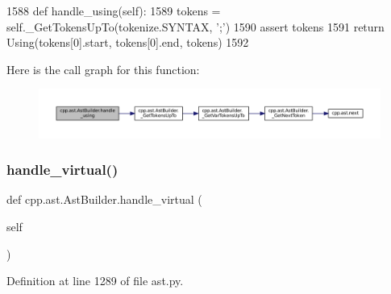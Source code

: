 \begin{DoxyCode}
1588     \textcolor{keyword}{def }handle\_using(self):
1589         tokens = self.\_GetTokensUpTo(tokenize.SYNTAX, \textcolor{stringliteral}{';'})
1590         \textcolor{keyword}{assert} tokens
1591         \textcolor{keywordflow}{return} Using(tokens[0].start, tokens[0].end, tokens)
1592 
\end{DoxyCode}
Here is the call graph for this function\+:
\nopagebreak
\begin{figure}[H]
\begin{center}
\leavevmode
\includegraphics[width=350pt]{classcpp_1_1ast_1_1AstBuilder_a785563f31bc3ed9559d9ce2854a83f1b_cgraph}
\end{center}
\end{figure}
\mbox{\label{classcpp_1_1ast_1_1AstBuilder_a44710dc0b8e5bdbecaa56f7c4b59c046}} 
\subsubsection{\texorpdfstring{handle\+\_\+virtual()}{handle\_virtual()}}
{\footnotesize\ttfamily def cpp.\+ast.\+Ast\+Builder.\+handle\+\_\+virtual (\begin{DoxyParamCaption}\item[{}]{self }\end{DoxyParamCaption})}



Definition at line 1289 of file ast.\+py.


